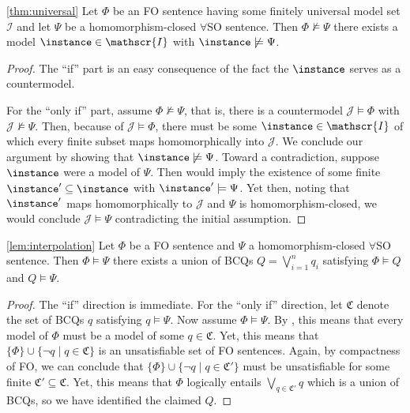 \begin{customthm}{\ref{thm:universal}}
Let $\Phi$ be an FO sentence having some finitely universal model set $\mathscr{I}$ and let $\Psi$ be a homomorphism-closed $\forall$SO sentence. Then $\Phi \not \models \Psi$ \iffi there exists a model $\instance \in \mathscr{I}$ with $\instance \not\models \Psi$.
\end{customthm}

\begin{proof}
The ``if'' part is an easy consequence of the fact the $\instance$ serves as a countermodel.

For the ``only if'' part, assume $\Phi \not \models \Psi$, that is, there is a countermodel $\mathcal{J} \models \Phi$ with $\mathcal{J} \not\models \Psi$. Then, because of $\mathcal{J} \models \Phi$, there must be some $\instance \in \mathscr{I}$ of which every finite subset maps homomorphically into $\mathcal{J}$. We conclude our argument by showing that $\instance \not\models \Psi$. Toward a contradiction, suppose $\instance$ were a model of $\Psi$. Then  would imply the existence of some finite $\instance' \subseteq \instance$ with $\instance' \models \Psi$. Yet then, noting that $\instance'$ maps homomorphically to $\mathcal{J}$ and $\Psi$ is homomorphism-closed, we would conclude $\mathcal{J} \models \Psi$ contradicting the initial assumption.
\end{proof}


\begin{customlem}{\ref{lem:interpolation}}
Let $\Phi$ be a FO sentence and $\Psi$ a homomorphism-closed $\forall$SO sentence.
Then $\Phi \models \Psi$ \iffi there exists a union of BCQs $Q = \bigvee_{i=1}^n q_{i}$ satisfying $\Phi \models Q$ and $Q \models \Psi$.
\end{customlem}

\begin{proof}
The ``if'' direction is immediate.
For the ``only if'' direction, let $\mathfrak{C}$ denote the set of BCQs $q$ satisfying $q \models \Psi$.
Now assume $\Phi \models \Psi$. By , this means that every model of $\Phi$
must be a model of some $q \in \mathfrak{C}$. Yet, this means that $\{\Phi\} \cup \{\neg q \mid q \in \mathfrak{C}\}$ is an unsatisfiable set of FO sentences. Again, by compactness of FO, we can conclude that $\{\Phi\} \cup \{\neg q \mid q \in \mathfrak{C}'\}$ must be unsatisfiable for some finite $\mathfrak{C}' \subseteq \mathfrak{C}$. Yet, this means that $\Phi$ logically entails $\bigvee_{q \in \mathfrak{C}'} q$ which is a union of BCQs, so we have identified the claimed $Q$.
\end{proof}



